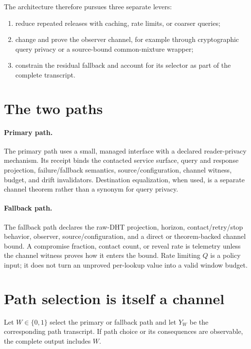 \documentclass[11pt]{article}
\begin{document}
The architecture therefore pursues three separate levers:
\begin{enumerate}[leftmargin=*]
\item reduce repeated releases with caching, rate limits, or coarser queries;
\item change and prove the observer channel, for example through cryptographic query privacy or a source-bound common-mixture wrapper;
\item constrain the residual fallback and account for its selector as part of the complete transcript.
\end{enumerate}

\section{The two paths}\label{sec:paths}
\paragraph{Primary path.}
The primary path uses a small, managed interface with a declared reader-privacy mechanism. Its receipt binds the contacted service surface, query and response projection, failure/fallback semantics, source/configuration, channel witness, budget, and drift invalidators. Destination equalization, when used, is a separate channel theorem rather than a synonym for query privacy.\cite{series:mceq,series:deployedsurfaces}

\paragraph{Fallback path.}
The fallback path declares the raw-DHT projection, horizon, contact/retry/stop behavior, observer, source/configuration, and a direct or theorem-backed channel bound. A compromise fraction, contact count, or reveal rate is telemetry unless the channel witness proves how it enters the bound. Rate limiting \(Q\) is a policy input; it does not turn an unproved per-lookup value into a valid window budget.

\section{Path selection is itself a channel}\label{sec:selector}
Let \(W\in\{0,1\}\) select the primary or fallback path and let \(Y_W\) be the corresponding path transcript. If path choice or its consequences are observable, the complete output includes \(W\).
\end{document}
